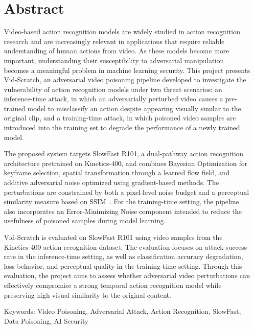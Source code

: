 \chapter*{Abstract}
\label{chap:abstract}

Video-based action recognition models are widely studied in action recognition research and are increasingly relevant in applications that require reliable understanding of human actions from video. As these models become more important, understanding their susceptibility to adversarial manipulation becomes a meaningful problem in machine learning security. This project presents Vid-Scratch, an adversarial video poisoning pipeline developed to investigate the vulnerability of action recognition models under two threat scenarios: an inference-time attack, in which an adversarially perturbed video causes a pre-trained model to misclassify an action despite appearing visually similar to the original clip, and a training-time attack, in which poisoned video samples are introduced into the training set to degrade the performance of a newly trained model.

The proposed system targets SlowFast R101, a dual-pathway action recognition architecture pretrained on Kinetics-400, and combines Bayesian Optimization for keyframe selection, spatial transformation through a learned flow field, and additive adversarial noise optimized using gradient-based methods. The perturbations are constrained by both a pixel-level noise budget and a perceptual similarity measure based on SSIM~\cite{wang2011ssim}. For the training-time setting, the pipeline also incorporates an Error-Minimizing Noise component intended to reduce the usefulness of poisoned samples during model learning.

Vid-Scratch is evaluated on SlowFast R101 using video samples from the Kinetics-400 action recognition dataset. The evaluation focuses on attack success rate in the inference-time setting, as well as classification accuracy degradation, loss behavior, and perceptual quality in the training-time setting. Through this evaluation, the project aims to assess whether adversarial video perturbations can effectively compromise a strong temporal action recognition model while preserving high visual similarity to the original content.

Keywords: Video Poisoning, Adversarial Attack, Action Recognition, SlowFast, Data Poisoning, AI Security